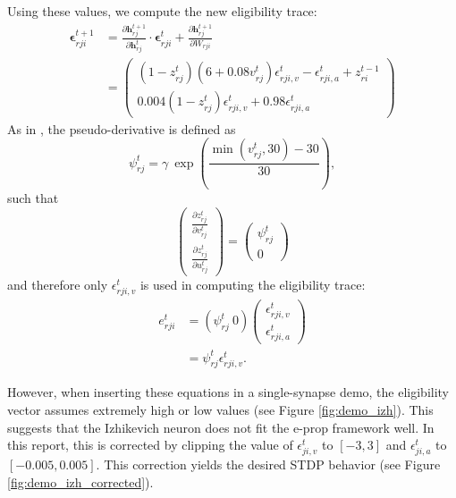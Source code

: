			Using these values, we compute the new eligibility trace:
	        \begin{align}
	        \bm{\epsilon}^{t+1}_{rji} &= \frac{\partial\mathbf{h}^{t+1}_{rj}}{\partial\mathbf{h}^t_{rj}}\cdot\bm{\epsilon}^t_{rji} + \frac{\partial\mathbf{h}^{t+1}_{rj}}{\partial W_{rji}}\\
	        &= \begin{pmatrix}\left(1-z^t_{rj}\right)\left(6+0.08v^t_{rj}\right)\epsilon^t_{rji, v} -\epsilon^t_{rji, a} + z_{ri}^{t-1}\\
	        0.004\left(1-z^t_{rj}\right)\epsilon^t_{rji, v} + 0.98\epsilon^t_{rji, a}
	        \end{pmatrix}\label{eq:ml_izhikevich_evector}
	        \end{align}
	        As in \citet{traub2020learning}, the pseudo-derivative is defined as
	        \begin{equation}
	        \psi^t_{rj} = \gamma\ \exp\left(\frac{\min\left(v^t_{rj}, 30\right) - 30}{30}\right),
	        \end{equation}
	        such that
	        \begin{equation}
	        \begin{pmatrix}\frac{\partial z^t_{rj}}{\partial v^t_{rj}}\\\frac{\partial z^t_{rj}}{\partial u^t_{rj}}\end{pmatrix}
	        = \begin{pmatrix}\psi^t_{rj}\\0\end{pmatrix}
	        \end{equation}
	        and therefore only $\epsilon^t_{rji, v}$ is used in computing the eligibility trace:
	        \begin{align}
	        e^t_{rji} &= \left(\psi^t_{rj}\ 0\right)\begin{pmatrix}\epsilon^t_{rji, v}\\\epsilon^t_{rji, a}\end{pmatrix} \\
	        &= \psi^t_{rj}\epsilon^t_{rji, v}.
	        \end{align}

	    However, when inserting these equations in a single-synapse demo, the eligibility vector assumes extremely high or low values (see Figure \ref{fig:demo_izh}).
	    This suggests that the Izhikevich neuron does not fit the e-prop framework well.
	    In this report, this is corrected by clipping the value of $\epsilon^t_{ji,v}$ to $\left[-3, 3\right]$ and $\epsilon^t_{ji,a}$ to $\left[-0.005, 0.005\right]$.
	    This correction yields the desired STDP behavior (see Figure \ref{fig:demo_izh_corrected}).

